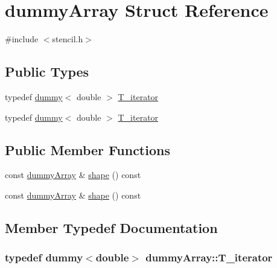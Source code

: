 \hypertarget{structdummyArray}{}\section{dummy\+Array Struct Reference}
\label{structdummyArray}


{\ttfamily \#include $<$stencil.\+h$>$}

\subsection*{Public Types}
\begin{DoxyCompactItemize}
\item 
typedef \hyperlink{classdummy}{dummy}$<$ double $>$ \hyperlink{structdummyArray_a66bfb0fd235c9f4bdca48b27b64b9412}{T\+\_\+iterator}
\item 
typedef \hyperlink{classdummy}{dummy}$<$ double $>$ \hyperlink{structdummyArray_a66bfb0fd235c9f4bdca48b27b64b9412}{T\+\_\+iterator}
\end{DoxyCompactItemize}
\subsection*{Public Member Functions}
\begin{DoxyCompactItemize}
\item 
const \hyperlink{structdummyArray}{dummy\+Array} \& \hyperlink{structdummyArray_a17e18214ef709d7f22b26ebc76b6eb07}{shape} () const 
\item 
const \hyperlink{structdummyArray}{dummy\+Array} \& \hyperlink{structdummyArray_a17e18214ef709d7f22b26ebc76b6eb07}{shape} () const 
\end{DoxyCompactItemize}


\subsection{Member Typedef Documentation}
\hypertarget{structdummyArray_a66bfb0fd235c9f4bdca48b27b64b9412}{}
\subsubsection[{T\+\_\+iterator}]{\setlength{\rightskip}{0pt plus 5cm}typedef {\bf dummy}$<$double$>$ {\bf dummy\+Array\+::\+T\+\_\+iterator}}\label{structdummyArray_a66bfb0fd235c9f4bdca48b27b64b9412}
\hypertarget{structdummyArray_a66bfb0fd235c9f4bdca48b27b64b9412}{}
